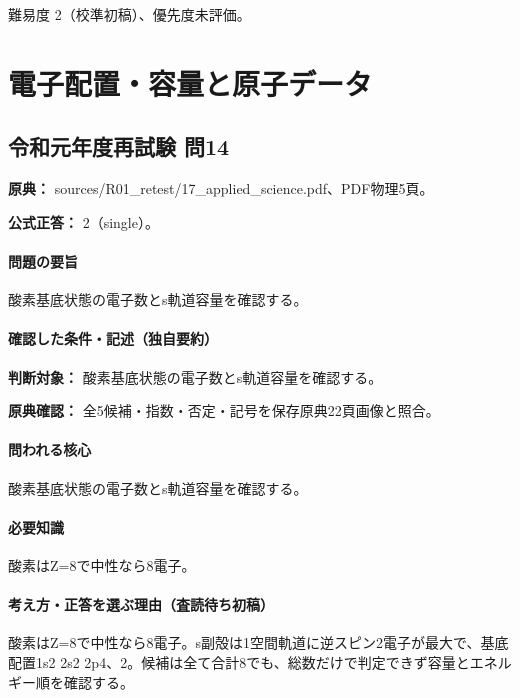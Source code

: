 \par 難易度 2（校準初稿）、優先度未評価。

\section{電子配置・容量と原子データ}

\subsection{令和元年度再試験 問14}
\label{q:r01-ret-applied-14}

\noindent\textbf{原典：} sources/R01\_retest/17\_applied\_science.pdf、PDF物理5頁。

\textbf{公式正答：} 2（single）。

\paragraph{問題の要旨} 酸素基底状態の電子数とs軌道容量を確認する。

\paragraph{確認した条件・記述（独自要約）}\mbox{}\par

\noindent\textbf{判断対象：} 酸素基底状態の電子数とs軌道容量を確認する。\par

\noindent\textbf{原典確認：} 全5候補・指数・否定・記号を保存原典22頁画像と照合。\par

\paragraph{問われる核心} 酸素基底状態の電子数とs軌道容量を確認する。

\paragraph{必要知識} 酸素はZ=\allowbreak{}8で中性なら8電子。

\paragraph{考え方・正答を選ぶ理由（査読待ち初稿）} 酸素はZ=\allowbreak{}8で中性なら8電子。s副殻は1空間軌道に逆スピン2電子が最大で、基底配置1s2 2s2 2p4、2。候補は全て合計8でも、総数だけで判定できず容量とエネルギー順を確認する。

